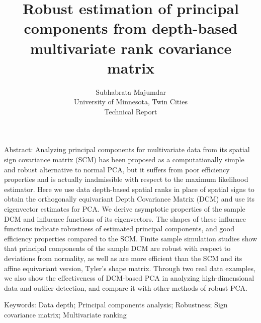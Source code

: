 \documentclass[fleqn,11pt]{article}
\begin{document}
\newtheorem{Theorem}{Theorem}[section]
\newtheorem{Lemma}[Theorem]{Lemma}
\newtheorem{Corollary}[Theorem]{Corollary}
\theoremstyle{definition} \newtheorem{Definition}[Theorem]{Definition}

\title{Robust estimation of principal components from depth-based multivariate rank covariance matrix}
\date{}
\author{Subhabrata Majumdar\\
University of Minnesota, Twin Cities\\
\vspace{1em}
Technical Report}
\maketitle

Abstract:
Analyzing principal components for multivariate data from its spatial sign covariance matrix (SCM) has been proposed as a computationally simple and robust alternative to normal PCA, but it suffers from poor efficiency properties and is actually inadmissible with respect to the maximum likelihood estimator. Here we use data depth-based spatial ranks in place of spatial signs to obtain the orthogonally equivariant Depth Covariance Matrix (DCM) and use its eigenvector estimates for PCA. We derive asymptotic properties of the sample DCM and influence functions of its eigenvectors. The shapes of these influence functions indicate robustness of estimated principal components, and good efficiency properties compared to the SCM. Finite sample simulation studies show that principal components of the sample DCM are robust with respect to deviations from normality, as well as are more efficient than the SCM and its affine equivariant version, Tyler's shape matrix. Through two real data examples, we also show the effectiveness of DCM-based PCA in analyzing high-dimensional data and outlier detection, and compare it with other methods of robust PCA.
\vspace{.5cm}

Keywords:
Data depth; Principal components analysis; Robustness; Sign covariance matrix; Multivariate ranking

\newpage
\end{document}
